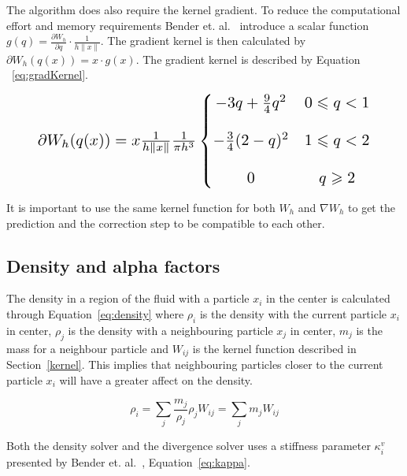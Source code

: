     The algorithm does also require the kernel gradient. To reduce the computational effort and memory requirements Bender et. al.~\cite{bender} introduce a scalar function $g(q) = \frac{\partial W_h}{\partial q} \cdot \frac{1}{h \left \| x \right \|}$. The gradient kernel is then calculated by $\partial W_h(q(x)) = x \cdot g(x)$. The gradient kernel is described by Equation ~\ref{eq:gradKernel}. 


    \begin{equation} \label{eq:gradKernel}
        \resizebox{0.88\linewidth}{!}{$
        \partial W_h(q(x)) =  x \frac{1}{h \left \| x \right \|} \frac{1}{\pi h^3} \left\{\begin{matrix}
        - 3q + \frac{9}{4}q^2 & 0 \leqslant q < 1 \\ 
        \\
        - \frac{3}{4}(2-q)^2 & 1 \leqslant q < 2\\ 
        \\
        0 & q \geqslant 2
        \end{matrix}\right.
        $}
    \end{equation}

    It is important to use the same kernel function for both $W_h$ and $\nabla W_h$ to get the prediction and the correction step to be compatible to each other.

\subsection{Density and alpha factors} \label{section:alpha}
    The density in a region of the fluid with a particle $x_i$ in the center is calculated through Equation~\ref{eq:density} where $\rho_i$ is the density with the current particle $x_i$ in center, $\rho_j$ is the density with a neighbouring particle $x_j$ in center, $m_j$ is the mass for a neighbour particle and $W_{ij}$ is the kernel function described in Section~\ref{kernel}. This implies that neighbouring particles closer to the current particle $x_i$ will have a greater affect on the density.    

    \begin{equation}\label{eq:density}
        \rho_i = \sum_j \frac{m_j}{\rho_j} \rho_j W_{ij} = \sum_j m_j W_{ij}
    \end{equation} 

    Both the density solver and the divergence solver uses a stiffness parameter $\kappa_i^v$ presented by Bender et. al.~\cite{bender}, Equation~\ref{eq:kappa}. 

